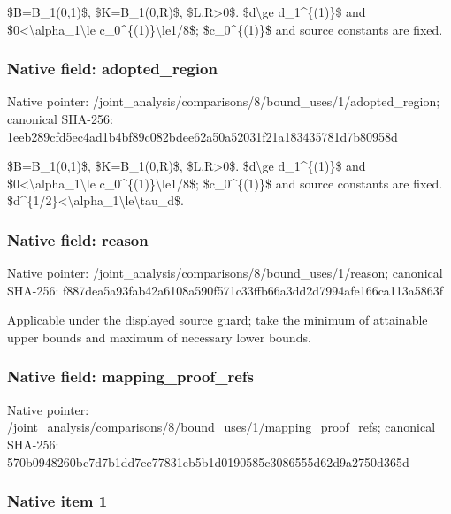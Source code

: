 \documentclass[10pt,a4paper]{article}
\begin{document}
\$B=B\_1(0,1)\$, \$K=B\_1(0,R)\$, \$L,R>0\$. \$d\textbackslash{}ge d\_1\textasciicircum{}\{(1)\}\$ and \$0<\textbackslash{}alpha\_1\textbackslash{}le c\_0\textasciicircum{}\{(1)\}\textbackslash{}le1/8\$; \$c\_0\textasciicircum{}\{(1)\}\$ and source constants are fixed.


\subsubsection{Native field: adopted\_region}


Native pointer: /joint\_analysis/comparis\allowbreak{}ons/8/bound\_uses/1/adopt\allowbreak{}ed\_region; canonical SHA-256: 1eeb289cfd5ec4ad1b4bf89c\allowbreak{}082bdee62a50a52031f21a18\allowbreak{}3435781d7b80958d


\$B=B\_1(0,1)\$, \$K=B\_1(0,R)\$, \$L,R>0\$. \$d\textbackslash{}ge d\_1\textasciicircum{}\{(1)\}\$ and \$0<\textbackslash{}alpha\_1\textbackslash{}le c\_0\textasciicircum{}\{(1)\}\textbackslash{}le1/8\$; \$c\_0\textasciicircum{}\{(1)\}\$ and source constants are fixed. \$d\textasciicircum{}\{1/2\}<\textbackslash{}alpha\_1\textbackslash{}le\textbackslash{}tau\_d\$.


\subsubsection{Native field: reason}


Native pointer: /joint\_analysis/comparis\allowbreak{}ons/8/bound\_uses/1/reaso\allowbreak{}n; canonical SHA-256: f887dea5a93fab42a6108a59\allowbreak{}0f571c33ffb66a3dd2d7994a\allowbreak{}fe166ca113a5863f


Applicable under the displayed source guard; take the minimum of attainable upper bounds and maximum of necessary lower bounds.


\subsubsection{Native field: mapping\_proof\_refs}


Native pointer: /joint\_analysis/comparis\allowbreak{}ons/8/bound\_uses/1/mappi\allowbreak{}ng\_proof\_refs; canonical SHA-256: 570b0948260bc7d7b1dd7ee7\allowbreak{}7831eb5b1d0190585c308655\allowbreak{}5d62d9a2750d365d



\subsubsection{Native item 1}
\end{document}
